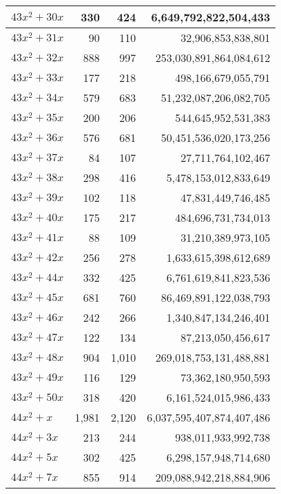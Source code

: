 \documentclass[a4paper]{amsproc}
\theoremstyle{plain}
\begin{document}
\begin{longtable}{ | l | r | r | r | }
$43x^2 + 30x$ & 330 & 424 & 6{,}649{,}792{,}822{,}504{,}433 \\ \hline
$43x^2 + 31x$ & 90 & 110 & 32{,}906{,}853{,}838{,}801 \\ \hline
$43x^2 + 32x$ & 888 & 997 & 253{,}030{,}891{,}864{,}084{,}612 \\ \hline
$43x^2 + 33x$ & 177 & 218 & 498{,}166{,}679{,}055{,}791 \\ \hline
$43x^2 + 34x$ & 579 & 683 & 51{,}232{,}087{,}206{,}082{,}705 \\ \hline
$43x^2 + 35x$ & 200 & 206 & 544{,}645{,}952{,}531{,}383 \\ \hline
$43x^2 + 36x$ & 576 & 681 & 50{,}451{,}536{,}020{,}173{,}256 \\ \hline
$43x^2 + 37x$ & 84 & 107 & 27{,}711{,}764{,}102{,}467 \\ \hline
$43x^2 + 38x$ & 298 & 416 & 5{,}478{,}153{,}012{,}833{,}649 \\ \hline
$43x^2 + 39x$ & 102 & 118 & 47{,}831{,}449{,}746{,}485 \\ \hline
$43x^2 + 40x$ & 175 & 217 & 484{,}696{,}731{,}734{,}013 \\ \hline
$43x^2 + 41x$ & 88 & 109 & 31{,}210{,}389{,}973{,}105 \\ \hline
$43x^2 + 42x$ & 256 & 278 & 1{,}633{,}615{,}398{,}612{,}689 \\ \hline
$43x^2 + 44x$ & 332 & 425 & 6{,}761{,}619{,}841{,}823{,}536 \\ \hline
$43x^2 + 45x$ & 681 & 760 & 86{,}469{,}891{,}122{,}038{,}793 \\ \hline
$43x^2 + 46x$ & 242 & 266 & 1{,}340{,}847{,}134{,}246{,}401 \\ \hline
$43x^2 + 47x$ & 122 & 134 & 87{,}213{,}050{,}456{,}617 \\ \hline
$43x^2 + 48x$ & 904 & 1{,}010 & 269{,}018{,}753{,}131{,}488{,}881 \\ \hline
$43x^2 + 49x$ & 116 & 129 & 73{,}362{,}180{,}950{,}593 \\ \hline
$43x^2 + 50x$ & 318 & 420 & 6{,}161{,}524{,}015{,}986{,}433 \\ \hline
$44x^2 + x$ & 1{,}981 & 2{,}120 & 6{,}037{,}595{,}407{,}874{,}407{,}486 \\ \hline
$44x^2 + 3x$ & 213 & 244 & 938{,}011{,}933{,}992{,}738 \\ \hline
$44x^2 + 5x$ & 302 & 425 & 6{,}298{,}157{,}948{,}714{,}680 \\ \hline
$44x^2 + 7x$ & 855 & 914 & 209{,}088{,}942{,}218{,}884{,}906 \\ \hline

\end{longtable}
\end{document}
